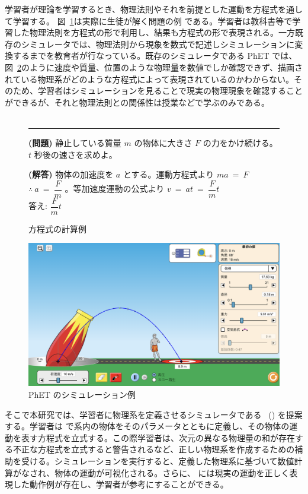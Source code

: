 学習者が理論を学習するとき、物理法則やそれを前提とした運動を方程式を通して学習する。
図~\ref{symbol_based}は実際に生徒が解く問題の例
である。学習者は教科書等で学習した物理法則を方程式の形で利用し、結果も方程式の形で表現される。一方既存のシミュレータでは、物理法則から現象を数式で記述しシミュレーションに変換するまでを教育者が行なっている。既存のシミュレータである PhET では、図~\ref{numeral_based}のように速度や質量、位置のような物理量を数値でしか確認できず、描画されている物理系がどのような方程式によって表現されているのかわからない。そのため、学習者はシミュレーションを見ることで現実の物理現象を確認することができるが、それと物理法則との関係性は授業などで学ぶのみである。\\\\

\begin{figure}[htb]
\noindent\rule{\linewidth}{0.4pt}

\small{\textbf{(問題)} 静止している質量 $m$ の物体に大きさ $F$ の力をかけ続ける。$t$ 秒後の速さを求めよ。}

\small{\textbf{(解答)} 物体の加速度を $a$ とする。運動方程式より $ma~=~F$ $\therefore~a~=~\dfrac{F}{m}$ 。等加速度運動の公式より $v~=~at~=~\dfrac{F}{m}t$\\
答え: $\dfrac{F}{m}t$}

\caption{方程式の計算例} \label{symbol_based}
\end{figure}

\begin{figure}[htb]
\centering
\includegraphics*[width=0.9\linewidth]{figure/PhET_example.png}
\caption{PhET のシミュレーション例} \label{numeral_based}
\end{figure}

そこで本研究では、学習者に物理系を定義させるシミュレータである \simname~(\simnamealt) を提案する。学習者は \simname で系内の物体をそのパラメータとともに定義し、その物体の運動を表す方程式を立式する。この際学習者は、次元の異なる物理量の和が存在する不正な方程式を立式すると警告されるなど、正しい物理系を作成するための補助を受ける。シミュレーションを実行すると、定義した物理系に基づいて数値計算がなされ、物体の運動が可視化される。さらに、 \simname には現実の運動を正しく表現した動作例が存在し、学習者が参考にすることができる。

